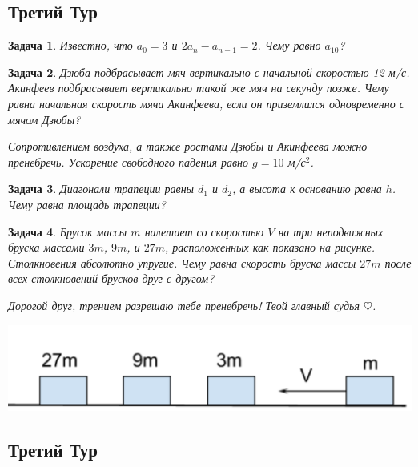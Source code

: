 \documentclass[a4paper, 12pt]{article}
\theoremstyle{break}
\newtheorem{problem}{Задача}[subsection]
\begin{document}
\thispagestyle{empty}
\subsection*{Третий Тур}

\begin{problem}
Известно, что $a_0 = 3$ и $2a_n - a_{n-1} = 2$. Чему равно $a_{10}$?
\end{problem}

\begin{problem}
Дзюба подбрасывает мяч вертикально с начальной скоростью 12 м/с.
Акинфеев подбрасывает вертикально такой же мяч на секунду позже.
Чему равна начальная скорость мяча Акинфеева,
если он приземлился одновременно с мячом Дзюбы?

Сопротивлением воздуха, а также ростами Дзюбы и Акинфеева можно пренебречь.
Ускорение свободного падения равно $g=10$ м/с$^2$.
\end{problem}



\begin{problem}
Диагонали трапеции равны $d_1$ и $d_2$, а высота к основанию равна $h$. Чему равна площадь трапеции?
\end{problem}



\begin{problem}
Брусок массы $m$ налетает со скоростью $V$ на три неподвижных бруска массами $3m$, $9m$, и $27m$,
расположенных как показано на рисунке. Столкновения абсолютно упругие.
Чему равна скорость бруска массы $27m$ после всех столкновений брусков друг с другом?

Дорогой друг, трением разрешаю тебе пренебречь! Твой главный судья $\heartsuit$.

\includegraphics[scale=0.3]{images/m_3m_27m_nowall.png}
\end{problem}




\subsection*{Третий Тур}
\setcounter{problem}{0}
\end{document}
